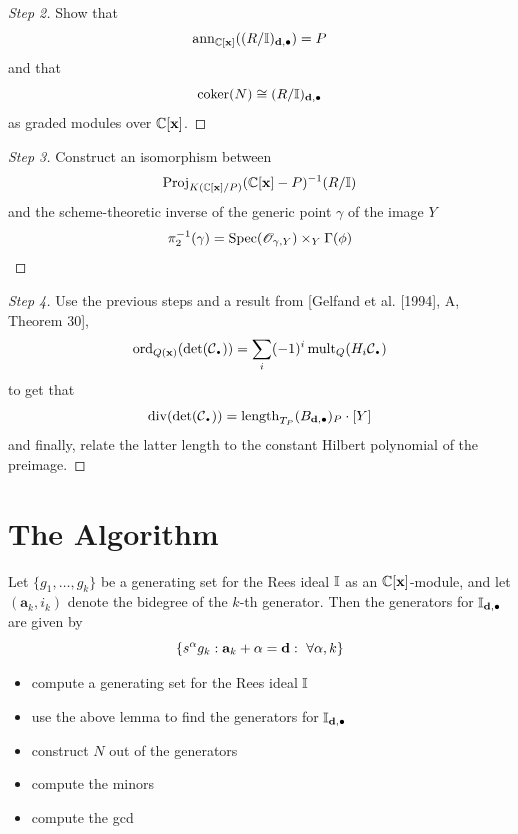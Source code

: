 \documentclass[]{beamer}
\begin{document}
\begin{frame}
\begin{proof}[Step 2]
	\def\qedsymbol{}
	Show that
	\[
		\operatorname{ann}_{\mathbb{C}[\mathbf x]}((R/\mathbb{I})_{\mathbf d,\bullet})=P
	\]
	and that
	\[
		\operatorname{coker}(N)\cong(R/\mathbb{I})_{\mathbf d,\bullet}
	\]
	as graded modules over $\mathbb{C}[\mathbf x]$.
\end{proof}
\begin{proof}[Step 3]
	\def\qedsymbol{}
	Construct an isomorphism between
	\[
		\operatorname{Proj}_{K(\mathbb{C}[\mathbf x]/P)}(\mathbb{C}[\mathbf x]-P)^{-1}(R/\mathbb{I})
	\]
	and the scheme-theoretic inverse of the generic point $\gamma$ of the image $Y$
	\[
		\pi_2^{-1}(\gamma)=\operatorname{Spec}(\mathscr{O}_{\gamma,Y})\times_Y\Gamma(\phi)
	\]
\end{proof}
\end{frame}

\begin{frame}
\begin{proof}[Step 4]
	\def\qedsymbol{}
	Use the previous steps and a result from [Gelfand et al. [1994], A, Theorem 30],
	\[
		\ord_{Q(\mathbf x)}(\det(\mathcal{C}_\nbul))=\sum_i (-1)^i \mult_Q(H_i\mathcal{C}_\nbul)
	\]
	to get that
	\[
		\thediv(\det(\mathcal{C}_\nbul))=\length_{T_P}(B_{\d,\bullet})_P\cdot[Y]
	\]
	and finally, relate the latter length to the constant Hilbert polynomial of the preimage.
\end{proof}
\end{frame}



\section{The Algorithm}

\begin{frame}
\begin{lemma}
	Let $\{g_1,\ldots,g_k\}$ be a generating set for the Rees ideal $\mathbb{I}$ as an $\mathbb{C}[\mathbf x]$-module,
	and let $({\mathbf a}_k,i_k)$ denote the bidegree of the $k$-th generator. Then the generators for
	$\mathbb{I}_{\mathbf d,\bullet}$ are given by
	\[
		\{s^\alpha g_k:{\mathbf a}_k+\alpha=\mathbf d:~\forall\alpha, k\}
	\]
\end{lemma}

\pause
\begin{algorithm}
	\begin{itemize}
		\item compute a generating set for the Rees ideal $\mathbb{I}$
		\item use the above lemma to find the generators for $\mathbb{I}_{\mathbf d,\bullet}$
		\item construct $N$ out of the generators
		\item compute the minors
		\item compute the gcd
	\end{itemize}
\end{algorithm}
\end{frame}
\end{document}

